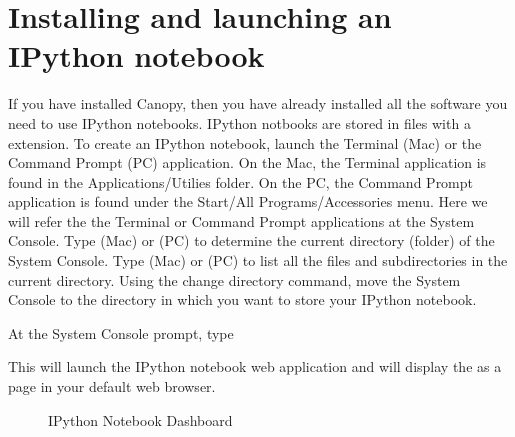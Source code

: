 \documentclass[letterpaper,10pt,english]{sphinxmanual}
\begin{document}
\section{Installing and launching an IPython notebook}
\label{\detokenize{apdx2/apdx2_ipynb:installing-and-launching-an-ipython-notebook}}
\sphinxAtStartPar
If you have installed Canopy, then you have already installed all the software you need to use IPython notebooks.  IPython notbooks are stored in files with a  extension.  To create an IPython notebook, launch the Terminal (Mac) or the Command Prompt (PC) application.  On the Mac, the Terminal application is found in the Applications/Utilies folder.  On the PC, the Command Prompt application is found under the Start/All Programs/Accessories menu.  Here we will refer the the Terminal or Command Prompt applications at the System Console.  Type  (Mac) or  (PC) to determine the current directory (folder) of the System Console.  Type  (Mac) or  (PC) to list all the files and subdirectories in the current directory.  Using the  change directory command, move the System Console to the directory in which you want to store your IPython notebook.

\sphinxAtStartPar
At the System Console prompt, type
\begin{quote}

\begin{sphinxVerbatim}[commandchars=\\\{\}]
   
\end{sphinxVerbatim}
\end{quote}

\sphinxAtStartPar
This will launch the IPython notebook web application and will display the {\hyperref[\detokenize{apdx2/apdx2_ipynb:fig-nbdashboard}]{}} as a page in your default web browser.

\begin{figure}[htbp]
\centering
\capstart

\noindent{}
\caption{IPython Notebook Dashboard}\label{\detokenize{apdx2/apdx2_ipynb:id1}}\label{\detokenize{apdx2/apdx2_ipynb:fig-nbdashboard}}\end{figure}
\end{document}
